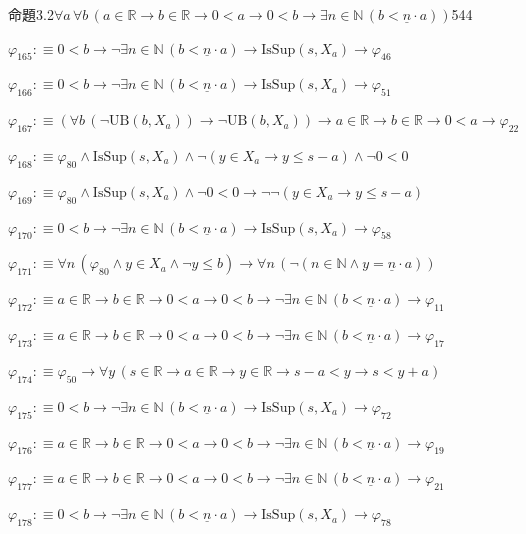 \begin{fullproof}{命題3.2}{$\forall a\,\forall b\,(a \in \mathbb{R} \to b \in \mathbb{R} \to 0 < a \to 0 < b \to \exists n \in \mathbb{N}\,(b < \underline{n} \cdot a))$}{544}
\begin{abbrevlist}
\item $\varphi_{165} :\equiv 0 < b \to \neg \exists n \in \mathbb{N}\,(b < \underline{n} \cdot a) \to \mathrm{IsSup}(s,X_{a}) \to \varphi_{46}$
\item $\varphi_{166} :\equiv 0 < b \to \neg \exists n \in \mathbb{N}\,(b < \underline{n} \cdot a) \to \mathrm{IsSup}(s,X_{a}) \to \varphi_{51}$
\item $\varphi_{167} :\equiv (\forall b\,(\neg \mathrm{UB}(b,X_{a})) \to \neg \mathrm{UB}(b,X_{a})) \to a \in \mathbb{R} \to b \in \mathbb{R} \to 0 < a \to \varphi_{22}$
\item $\varphi_{168} :\equiv \varphi_{80} \land \mathrm{IsSup}(s,X_{a}) \land \neg (y \in X_{a} \to y \leq s - a) \land \neg 0 < 0$
\item $\varphi_{169} :\equiv \varphi_{80} \land \mathrm{IsSup}(s,X_{a}) \land \neg 0 < 0 \to \neg \neg (y \in X_{a} \to y \leq s - a)$
\item $\varphi_{170} :\equiv 0 < b \to \neg \exists n \in \mathbb{N}\,(b < \underline{n} \cdot a) \to \mathrm{IsSup}(s,X_{a}) \to \varphi_{58}$
\item $\varphi_{171} :\equiv \forall n\,(\varphi_{80} \land y \in X_{a} \land \neg y \leq b) \to \forall n\,(\neg (n \in \mathbb{N} \land y = \underline{n} \cdot a))$
\item $\varphi_{172} :\equiv a \in \mathbb{R} \to b \in \mathbb{R} \to 0 < a \to 0 < b \to \neg \exists n \in \mathbb{N}\,(b < \underline{n} \cdot a) \to \varphi_{11}$
\item $\varphi_{173} :\equiv a \in \mathbb{R} \to b \in \mathbb{R} \to 0 < a \to 0 < b \to \neg \exists n \in \mathbb{N}\,(b < \underline{n} \cdot a) \to \varphi_{17}$
\item $\varphi_{174} :\equiv \varphi_{50} \to \forall y\,(s \in \mathbb{R} \to a \in \mathbb{R} \to y \in \mathbb{R} \to s - a < y \to s < y + a)$
\item $\varphi_{175} :\equiv 0 < b \to \neg \exists n \in \mathbb{N}\,(b < \underline{n} \cdot a) \to \mathrm{IsSup}(s,X_{a}) \to \varphi_{72}$
\item $\varphi_{176} :\equiv a \in \mathbb{R} \to b \in \mathbb{R} \to 0 < a \to 0 < b \to \neg \exists n \in \mathbb{N}\,(b < \underline{n} \cdot a) \to \varphi_{19}$
\item $\varphi_{177} :\equiv a \in \mathbb{R} \to b \in \mathbb{R} \to 0 < a \to 0 < b \to \neg \exists n \in \mathbb{N}\,(b < \underline{n} \cdot a) \to \varphi_{21}$
\item $\varphi_{178} :\equiv 0 < b \to \neg \exists n \in \mathbb{N}\,(b < \underline{n} \cdot a) \to \mathrm{IsSup}(s,X_{a}) \to \varphi_{78}$

\end{abbrevlist}
\end{fullproof}

